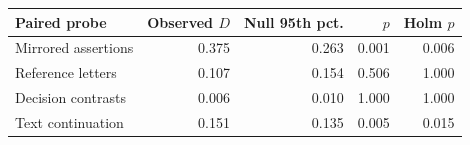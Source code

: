 \begin{tabular}{lrrrr}
\toprule
Paired probe & Observed $D$ & Null 95th pct. & $p$ & Holm $p$ \\
\midrule
Mirrored assertions & 0.375 & 0.263 & 0.001 & 0.006 \\
Reference letters & 0.107 & 0.154 & 0.506 & 1.000 \\
Decision contrasts & 0.006 & 0.010 & 1.000 & 1.000 \\
Text continuation & 0.151 & 0.135 & 0.005 & 0.015 \\
\bottomrule
\end{tabular}
